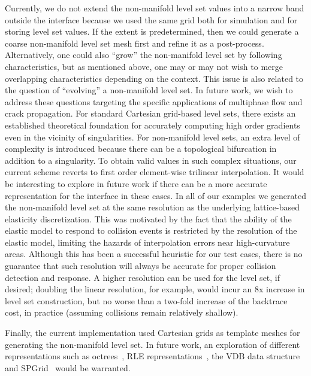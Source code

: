 Currently, we do not extend the non-manifold level set values into a
narrow band outside the interface because we used the same grid both
for simulation and for storing level set values. If the extent is
predetermined, then we could generate a coarse non-manifold level set
mesh first and refine it as a post-process. Alternatively, one could
also ``grow'' the non-manifold level set by following characteristics,
but as mentioned above, one may or may not wish to merge overlapping
characteristics depending on the context. This issue is also related
to the question of ``evolving'' a non-manifold level set.  In future
work, we wish to address these questions targeting the specific
applications of multiphase flow and crack propagation.  For standard
Cartesian grid-based level sets, there exists an established
theoretical foundation for accurately computing high order gradients
even in the vicinity of singularities. For non-manifold level sets, an
extra level of complexity is introduced because there can be a
topological bifurcation in addition to a singularity.  To obtain valid
values in such complex situations, our current scheme reverts to first
order element-wise trilinear interpolation.  It would be interesting
to explore in future work if there can be a more accurate
representation for the interface in these cases.  In all of our
examples we generated the non-manifold level set at the same
resolution as the underlying lattice-based elasticity
discretization. This was motivated by the fact that the ability of the
elastic model to respond to collision events is restricted by the
resolution of the elastic model, limiting the hazards of interpolation
errors near high-curvature areas.  Although this has been a successful
heuristic for our test cases, there is no guarantee that such
resolution will always be accurate for proper collision detection and
response. A higher resolution can be used for the level set, if
desired; doubling the linear resolution, for example, would incur an
8x increase in level set construction, but no worse than a two-fold
increase of the backtrace cost, in practice (assuming collisions
remain relatively shallow).

Finally, the current implementation used Cartesian grids as template
meshes for generating the non-manifold level set. In future work, an
exploration of different representations such as
octrees~\citep{LosasGF:2004}, RLE
representations~\citep{HoustNBNM:2006,IrvinGLF:2006,ChentM:2011}, the
VDB data structure~\citep{Muset:2013} and SPGrid~\citep{SetalABS:2014}
would be warranted.

